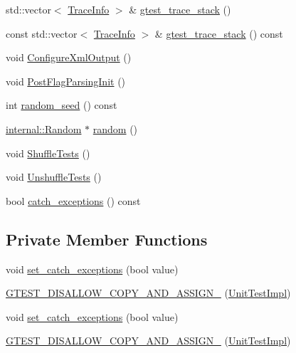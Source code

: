 \begin{DoxyCompactItemize}
std\-::vector$<$ \hyperlink{structtesting_1_1internal_1_1TraceInfo}{\-Trace\-Info} $>$ \& \hyperlink{classtesting_1_1internal_1_1UnitTestImpl_a07ea86c2b77af0393783430499b22321}{gtest\-\_\-trace\-\_\-stack} ()
\item 
const std\-::vector$<$ \hyperlink{structtesting_1_1internal_1_1TraceInfo}{\-Trace\-Info} $>$ \& \hyperlink{classtesting_1_1internal_1_1UnitTestImpl_a289d5745773f4d2e5b339960d3e9ce68}{gtest\-\_\-trace\-\_\-stack} () const 
\item 
void \hyperlink{classtesting_1_1internal_1_1UnitTestImpl_acc7d69fbca3370bbdd13ee2b63576030}{\-Configure\-Xml\-Output} ()
\item 
void \hyperlink{classtesting_1_1internal_1_1UnitTestImpl_a3d68c6d1fdec822210f96171a3b57b47}{\-Post\-Flag\-Parsing\-Init} ()
\item 
int \hyperlink{classtesting_1_1internal_1_1UnitTestImpl_ac0bcee84bdc839bfabd0a829642ab4f7}{random\-\_\-seed} () const 
\item 
\hyperlink{classtesting_1_1internal_1_1Random}{internal\-::\-Random} $\ast$ \hyperlink{classtesting_1_1internal_1_1UnitTestImpl_a485dc510d5b4af5835231d23e5510b25}{random} ()
\item 
void \hyperlink{classtesting_1_1internal_1_1UnitTestImpl_a1835112b5b9bb3931956c68f05a3cf69}{\-Shuffle\-Tests} ()
\item 
void \hyperlink{classtesting_1_1internal_1_1UnitTestImpl_ae4c0afbfb6a7d13aece4c3a256a5d01d}{\-Unshuffle\-Tests} ()
\item 
bool \hyperlink{classtesting_1_1internal_1_1UnitTestImpl_ac7a9709851e6b257627f82921cbdeb7d}{catch\-\_\-exceptions} () const 
\end{DoxyCompactItemize}
\subsection*{\-Private \-Member \-Functions}
\begin{DoxyCompactItemize}
\item 
void \hyperlink{classtesting_1_1internal_1_1UnitTestImpl_a74595949fcf89d662112e08b5e21e560}{set\-\_\-catch\-\_\-exceptions} (bool value)
\item 
\hyperlink{classtesting_1_1internal_1_1UnitTestImpl_aa55ac9e56273d4b29e38abe67003384f}{\-G\-T\-E\-S\-T\-\_\-\-D\-I\-S\-A\-L\-L\-O\-W\-\_\-\-C\-O\-P\-Y\-\_\-\-A\-N\-D\-\_\-\-A\-S\-S\-I\-G\-N\-\_\-} (\hyperlink{classtesting_1_1internal_1_1UnitTestImpl}{\-Unit\-Test\-Impl})
\item 
void \hyperlink{classtesting_1_1internal_1_1UnitTestImpl_a74595949fcf89d662112e08b5e21e560}{set\-\_\-catch\-\_\-exceptions} (bool value)
\item 
\hyperlink{classtesting_1_1internal_1_1UnitTestImpl_aa55ac9e56273d4b29e38abe67003384f}{\-G\-T\-E\-S\-T\-\_\-\-D\-I\-S\-A\-L\-L\-O\-W\-\_\-\-C\-O\-P\-Y\-\_\-\-A\-N\-D\-\_\-\-A\-S\-S\-I\-G\-N\-\_\-} (\hyperlink{classtesting_1_1internal_1_1UnitTestImpl}{\-Unit\-Test\-Impl})
\end{DoxyCompactItemize}
